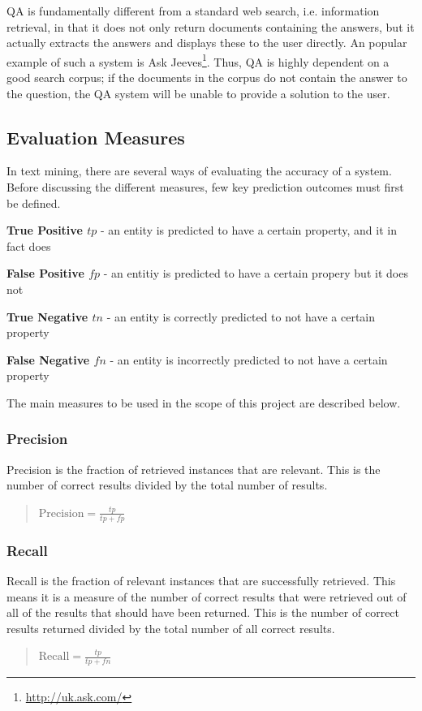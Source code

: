 QA is fundamentally different from a standard web search, i.e. information retrieval, in that it does not only return documents containing the answers, but it actually extracts the answers and displays these to the user directly. An popular example of such a system is Ask Jeeves\footnote{\url{http://uk.ask.com/}}.
Thus, QA is highly dependent on a good search corpus; if the documents in the corpus do not contain the answer to the question, the QA system will be unable to provide a solution to the user.  

\subsection{Evaluation Measures}
In text mining, there are several ways of evaluating the accuracy of a system. Before discussing the different measures, few key prediction outcomes must first be defined.

\textbf{True Positive $tp$} - an entity is predicted to have a certain property, and it in fact does

\textbf{False Positive $fp$} - an entitiy is predicted to have a certain propery but it does not

\textbf{True Negative $tn$} - an entity is correctly predicted to not have a certain property

\textbf{False Negative $fn$} - an entity is incorrectly predicted to not have a certain property

The main measures to be used in the scope of this project are described below.

\subsubsection{Precision}
Precision is the fraction of retrieved instances that are relevant. This is the number of correct results divided by the total number of results.
\begin{quote}
$\mathrm{Precision}=\frac{tp}{tp+fp}$
\end{quote}

\subsubsection{Recall}
Recall is the fraction of relevant instances that are successfully retrieved. This means it is a measure of the number of correct results that were retrieved out of all of the results that should have been returned. This is the number of correct results returned divided by the total number of all correct results.
\begin{quote}
$\mathrm{Recall}=\frac{tp}{tp+fn}$
\end{quote}

